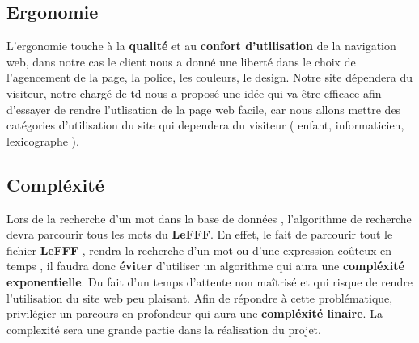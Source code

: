 \subsection{Ergonomie}
L’ergonomie touche à la \textbf{qualité} et au \textbf{confort d’utilisation} de la navigation web, dans notre cas le client nous a donné une liberté dans le choix de l'agencement de la page, la police, les couleurs, le design. Notre site dépendera du visiteur, notre chargé de td nous a proposé une idée qui va être efficace afin d'essayer de rendre l'utlisation de la page web facile, car nous allons mettre des catégories d'utilisation du site qui dependera du visiteur ( enfant, informaticien, lexicographe ).

\subsection{Compléxité}
Lors de la recherche d'un mot dans la base de données , l'algorithme de recherche devra parcourir tous les mots du \textbf{LeFFF}. En effet, le fait de parcourir tout le fichier \textbf{LeFFF} , rendra la recherche d'un mot ou d'une expression coûteux en temps , il faudra donc \textbf{éviter} d'utiliser  un algorithme qui aura une \textbf{compléxité exponentielle}. Du fait d'un temps d'attente non maîtrisé et qui risque de rendre l'utilisation du site web peu plaisant. Afin de répondre à cette problématique, privilégier un parcours en profondeur qui aura une \textbf{compléxité linaire}.
La complexité sera une grande partie dans la réalisation du projet.
